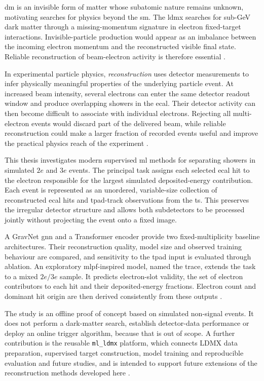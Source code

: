 \glsresetall

\Gls{dm} is an invisible form of matter whose subatomic nature remains
unknown, motivating searches for physics beyond the \gls{sm}. The \gls{ldmx}
searches for sub-GeV dark matter through a missing-momentum signature in
electron fixed-target interactions. Invisible-particle production would
appear as an imbalance between the incoming electron momentum and the
reconstructed visible final state. Reliable reconstruction of beam-electron
activity is therefore essential
\cite{cirelli2026-darkmatter,akesson2018-ldmx,ldmx2025-overview}.

In experimental particle physics, \emph{reconstruction} uses detector
measurements to infer physically meaningful properties of the underlying
particle event. At increased beam intensity, several electrons can enter the same detector
readout window and produce overlapping showers in the \gls{ecal}. Their
detector activity can then become difficult to associate with individual
electrons. Rejecting all multi-electron events would discard part of the
delivered beam, while reliable reconstruction could make a larger fraction of
recorded events useful and improve the practical physics reach of the
experiment \cite{ldmx2025-overview}.

This thesis investigates modern supervised \gls{ml} methods for separating showers
in simulated \(2e\) and \(3e\) events. The principal task assigns each
selected \gls{ecal} hit to the electron responsible for the largest simulated
deposited-energy contribution. Each event is represented as an unordered,
variable-size collection of reconstructed \gls{ecal} hits and
\gls{tpad}-track observations from the \gls{ts}. This preserves the irregular
detector structure and allows both subdetectors to be processed jointly
without projecting the event onto a fixed image.

A GravNet \gls{gnn} and a Transformer encoder provide two fixed-multiplicity
baseline architectures. Their reconstruction quality, model size and observed
training behaviour are compared, and sensitivity to the \gls{tpad} input is
evaluated through ablation. An exploratory \gls{mlpf}-inspired model,
named the \gls{trace}, extends the task to a mixed \(2e/3e\) sample. It predicts electron-slot
validity, the set of electron contributors to each hit and their
deposited-energy fractions. Electron count and dominant hit origin are then
derived consistently from these outputs
\cite{qasim2019-gravnet,pata2021-mlpf,pata2026-mlpf}.

The study is an offline proof of concept based on simulated non-signal events.
It does not perform a dark-matter search, establish detector-data performance
or deploy an online trigger algorithm, because that is out of scope. A further contribution is the reusable
\texttt{ml\_ldmx} platform, which connects LDMX data preparation, supervised
target construction, model training and reproducible evaluation and future studies, and is intended to support future extensions of the reconstruction methods developed here \cite{ml_ldmx-github}.

